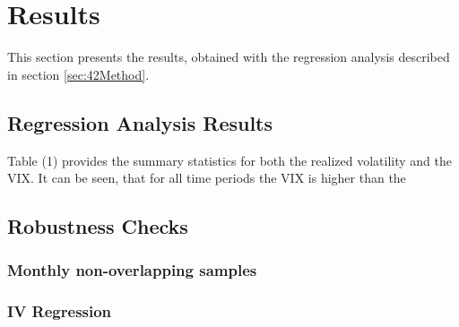 
\section{Results}\label{sec:5Results}

This section presents the results, obtained with the regression analysis described in section \ref{sec:42Method}. 

\subsection{Regression Analysis Results}\label{sec:51Regression}
Table (1) provides the summary statistics for both the realized volatility and the VIX. It can be seen, that for all time periods the VIX is higher than the 



%

%

%

%


\subsection{Robustness Checks}\label{sec51Robustness}

\subsubsection{Monthly non-overlapping samples}


%


\subsubsection{IV Regression}
















